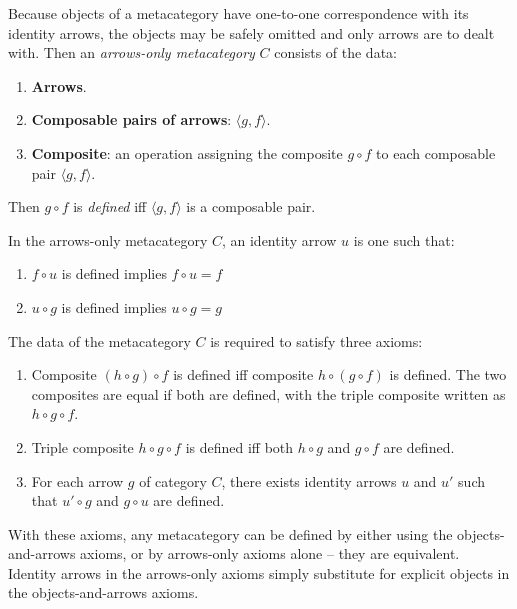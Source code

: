 \begin{definition}
    Because objects of a metacategory have one-to-one correspondence with its identity arrows, the objects may be safely omitted and only arrows are to dealt with. Then an \textit{arrows-only metacategory} $C$ consists of the data:
    \begin{enumerate}
        \item \textbf{Arrows}.
        \item \textbf{Composable pairs of arrows}: $\langle g, f \rangle$.
        \item \textbf{Composite}: an operation assigning the composite $g \circ f$ to each composable pair $\langle g, f \rangle$.
    \end{enumerate}
    
    Then $g \circ f$ is \textit{defined} iff $\langle g, f \rangle$ is a composable pair.
    
    In the arrows-only metacategory $C$, an identity arrow $u$ is one such that:
    \begin{enumerate}
        \item $f \circ u$ is defined implies $f \circ u = f$
        \item $u \circ g$ is defined implies $u \circ g = g$
    \end{enumerate}
    
    The data of the metacategory $C$ is required to satisfy three axioms:
    \begin{enumerate}
        \item Composite $(h \circ g) \circ f$ is defined iff composite $h \circ (g \circ f)$ is defined. The two composites are equal if both are defined, with the triple composite written as $h \circ g \circ f$.
        \item Triple composite $h \circ g \circ f$ is defined iff both $h \circ g$ and $g \circ f$ are defined.
        \item For each arrow $g$ of category $C$, there exists identity arrows $u$ and $u'$ such that $u' \circ g$ and $g \circ u$ are defined.
    \end{enumerate}
\end{definition}

\begin{remark}
    With these axioms, any metacategory can be defined by either using the objects-and-arrows axioms, or by arrows-only axioms alone -- they are equivalent. Identity arrows in the arrows-only axioms simply substitute for explicit objects in the objects-and-arrows axioms.
\end{remark}

